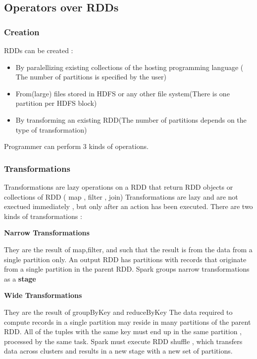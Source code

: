 \documentclass{article}
\begin{document}
\subsection{Operators over RDDs}
\subsubsection{Creation}

RDDs can be created : 
\begin{itemize}
    \item By paralellizing existing collections of the hosting programming language ( The number of partitions is specified by the user)
    \item From(large) files stored in HDFS or any other file system(There is one partition per HDFS block)
    \item By transforming an existing RDD(The number of partitions depends on the type of transformation)
\end{itemize}

Programmer can perform 3 kinds of operations.

\subsubsection{Transformations}

Transformations are lazy operations on a RDD that return RDD objects or collections of RDD ( map , filter , join)
Transformations are lazy and are not exectued immediately , but only after an action has been executed.
There are two kinds of transformations : 

\vspace{3mm}
\textbf{Narrow Transformations}

They are the result of map,filter, and such that the result is from the data from a single partition only.
An output RDD has partitions with records that originate from a single partition in the parent RDD.
Spark groups narrow transformations as a \textbf{stage}

\vspace{3mm}
\textbf{Wide Transformations}

They are the result of groupByKey and reduceByKey
The data required to compute records in a single partition may reside in many partitions of the parent RDD.
All of the tuples with the same key must end up in the same partition , processed by the same task.
Spark must execute RDD shuffle , which transfers data across clusters and results in a new stage with a new set of partitions.
\end{document}
